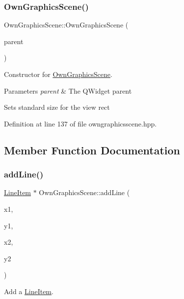 \subsubsection{\texorpdfstring{Own\+Graphics\+Scene()}{OwnGraphicsScene()}}
{\footnotesize\ttfamily Own\+Graphics\+Scene\+::\+Own\+Graphics\+Scene (\begin{DoxyParamCaption}\item[{Q\+Widget $\ast$}]{parent }\end{DoxyParamCaption})\hspace{0.3cm}{\ttfamily [inline]}}



Constructor for \mbox{\hyperlink{classOwnGraphicsScene}{Own\+Graphics\+Scene}}. 


\begin{DoxyParams}{Parameters}
{\em parent} & The Q\+Widget parent\\
\hline
\end{DoxyParams}
Sets standard size for the view rect 

Definition at line 137 of file owngraphicsscene.\+hpp.



\subsection{Member Function Documentation}
\mbox{\label{classOwnGraphicsScene_a4251b836ee575083f4eeaa73254723f4}} 
\subsubsection{\texorpdfstring{add\+Line()}{addLine()}}
{\footnotesize\ttfamily \mbox{\hyperlink{classLineItem}{Line\+Item}} $\ast$ Own\+Graphics\+Scene\+::add\+Line (\begin{DoxyParamCaption}\item[{unsigned}]{x1,  }\item[{unsigned}]{y1,  }\item[{unsigned}]{x2,  }\item[{unsigned}]{y2 }\end{DoxyParamCaption})}



Add a \mbox{\hyperlink{classLineItem}{Line\+Item}}. 


